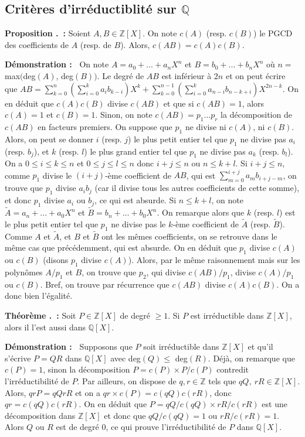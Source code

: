 \documentclass[5pt,a4paper]{article}
\newcounter{propcounter}[subsection]
\newcounter{thmcounter}[subsection]
\renewcommand{\thepropcounter}{\thesubsection.\arabic{propcounter}}
\renewcommand{\thethmcounter}{\thesubsection.\arabic{thmcounter}}
\newcommand{\prop}[1]{
    \stepcounter{propcounter}
    \hypertarget{p:\thepropcounter}{}%
    \noindent\textbf{Proposition \thepropcounter ~:} #1 \newline
}
\newcommand{\thm}[1]{
    \stepcounter{thmcounter}
    \hypertarget{t:\thethmcounter}{}%
    \noindent\textbf{Théorème \thethmcounter ~:} #1 \newline
}
\newcommand{\demo}[1]{
    \textbf{Démonstration :~} #1 \newline
}
\begin{document}
\begin{onehalfspacing}
\subsection{Critères d'irréductiblité sur $\mathbb{Q}$}

\prop{Soient $A, B \in \mathbb{Z}[X]$. On note $c(A)$ (resp. $c(B)$) le PGCD des coefficients de $A$ (resp. de $B$). Alors, $c(AB) = c(A)c(B)$.}
\demo{On note $A = a_0 + ... + a_nX^n$ et $B = b_0 + ... + b_nX^n$ où $n = $ max$($deg$(A)$, deg$(B))$. Le degré de $AB$ est inférieur à $2n$ et on peut écrire que $AB =  \displaystyle{\sum_{k = 0}^{n}} (\sum_{i = 0}^k a_ib_{k - i})X^k + \sum_{k = 0}^{n - 1} (\sum_{i = 0}^k a_{n - i}b_{n - k + i})X^{2n - k}$. On en déduit que $c(A)c(B)$ divise $c(AB)$ et que si $c(AB) = 1$, alors $c(A) = 1$ et $c(B) = 1$. Sinon, on note $c(AB) = p_1...p_r$ la décomposition de $c(AB)$ en facteurs premiers. On suppose que $p_1$ ne divise ni $c(A)$, ni $c(B)$. Alors, on peut se donner $i$ (resp. $j$) le plus petit entier tel que $p_1$ ne divise pas $a_i$ (resp. $b_j$), et $k$ (resp. $l$) le plus grand entier tel que $p_1$ ne divise pas $a_k$ (resp. $b_l$). On a $0 \leq i \leq k \leq n$ et $0 \leq j \leq l \leq n$ donc $i+j \leq n$ ou $n \leq k+l$. Si $i+j \leq n$, comme $p_1$ divise le $(i+j)$-ème coefficient de $AB$, qui est $\displaystyle{\sum_{m = 0}^{i+j}} a_mb_{i + j - m}$, on trouve que $p_1$ divise $a_ib_j$ (car il divise tous les autres coefficients de cette somme), et donc $p_1$ divise $a_i$ ou $b_j$, ce qui est absurde. Si $n \leq k+l$, on note $\tilde{A} = a_n + ... + a_0X^n$ et $\tilde{B} = b_n + ... + b_0X^n$. On remarque alors que $k$ (resp. $l$) est le plus petit entier tel que $p_1$ ne divise pas le $k$-ème coefficient de $\tilde{A}$ (resp. $\tilde{B}$). Comme $A$ et $\tilde{A}$, et $B$ et $\tilde{B}$ ont les mêmes coefficients, on se retrouve dans le même cas que précédemment, qui est absurde. On en déduit que $p_1$ divise $c(A)$ ou $c(B)$ (disons $p_1$ divise $c(A)$). Alors, par le même raisonnement mais sur les polynômes $A/p_1$ et $B$, on trouve que $p_2$, qui divise $c(AB)/p_1$, divise $c(A)/p_1$ ou $c(B)$. Bref, on trouve par récurrence que $c(AB)$ divise $c(A)c(B)$. On a donc bien l'égalité.}

\thm{Soit $P \in \mathbb{Z}[X]$ de degré $\geq 1$. Si $P$ est irréductible dans $\mathbb{Z}[X]$, alors il l'est aussi dans $\mathbb{Q}[X]$.}
\demo{Supposons que $P$ soit irréductible dans $\mathbb{Z}[X]$ et qu'il s'écrive $P = QR$ dans $\mathbb{Q}[X]$ avec deg$(Q) \leq$ deg$(R)$. Déjà, on remarque que $c(P) = 1$, sinon la décomposition $P = c(P) \times P/c(P)$ contredit l'irréductibilité de $P$. Par ailleurs, on dispose de $q, r \in \mathbb{Z}$ tels que $qQ,~rR \in \mathbb{Z}[X]$. Alors, $qrP = qQrR$ et on a $qr \times c(P) = c(qQ)c(rR)$, donc $qr = c(qQ)c(rR)$. On en déduit que $P = qQ/c(qQ) \times rR/c(rR)$ est une décomposition dans $\mathbb{Z}[X]$ et donc que $qQ/c(qQ) = 1$ ou $rR/c(rR) = 1$. Alors $Q$ ou $R$ est de degré $0$, ce qui prouve l'irréductibilité de $P$ dans $\mathbb{Q}[X]$.}


\end{onehalfspacing}
\end{document}
